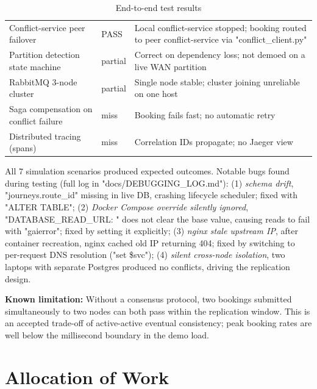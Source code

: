 \documentclass[11pt,a4paper]{article}
\begin{document}
\begin{table}[H]
\begin{tabularx}{\textwidth}{L{4.8cm} L{1.2cm} X}
  Conflict-service peer failover           & PASS & Local conflict-service stopped; booking routed to peer conflict-service via "conflict\_client.py" \\
  Partition detection state machine        & partial & Correct on dependency loss; not demoed on a live WAN partition \\
  RabbitMQ 3-node cluster                  & partial & Single node stable; cluster joining unreliable on one host \\
  Saga compensation on conflict failure    & miss    & Booking fails fast; no automatic retry \\
  Distributed tracing (spans)              & miss    & Correlation IDs propagate; no Jaeger view \\
  \bottomrule
\end{tabularx}
\caption{End-to-end test results}
\label{tab:results}
\end{table}

All 7 simulation scenarios produced expected outcomes. Notable bugs found during testing (full log in "docs/DEBUGGING\_LOG.md"): (1) \emph{schema drift}, "journeys.route\_id" missing in live DB, crashing lifecycle scheduler; fixed with "ALTER TABLE"; (2) \emph{Docker Compose override silently ignored}, "DATABASE\_READ\_URL: " does not clear the base value, causing reads to fail with "gaierror"; fixed by setting it explicitly; (3) \emph{nginx stale upstream IP}, after container recreation, nginx cached old IP returning 404; fixed by switching to per-request DNS resolution ("set \$svc"); (4) \emph{silent cross-node isolation}, two laptops with separate Postgres produced no conflicts, driving the replication design.

\textbf{Known limitation:} Without a consensus protocol, two bookings submitted simultaneously to two nodes can both pass within the replication window. This is an accepted trade-off of active-active eventual consistency; peak booking rates are well below the millisecond boundary in the demo load.

\section{Allocation of Work}
\label{sec:allocation}
\end{document}
